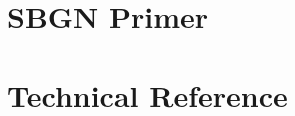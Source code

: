 \documentclass[a4paper,11pt,oneside]{memoir}
\begin{document}

\frontmatter


%

\tableofcontents

\mainmatter
\linenumbers

\part{SBGN Primer}




%



\part{Technical Reference}







\appendix







\backmatter

\clearpage




\end{document}
